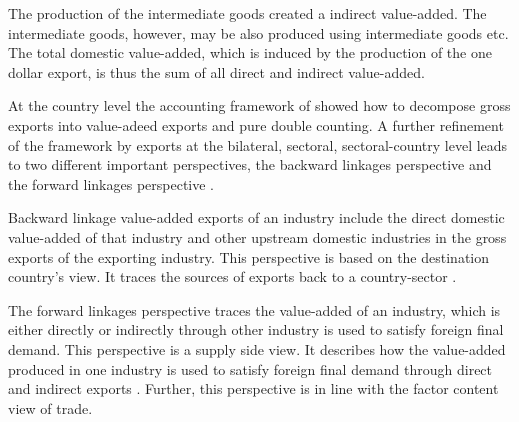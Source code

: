   The production of the intermediate goods created a indirect value-added.
  The intermediate goods, however, may be also produced using intermediate goods etc.
  The total domestic value-added, which is induced by the production of the one dollar export, is thus the sum of all direct and indirect value-added.
     \par
  At the country level the accounting framework of \textcite{Koopman} showed how to decompose gross exports into value-adeed exports and pure double counting.
   A further refinement of the framework by \textcite{wang2013} exports at the bilateral, sectoral, sectoral-country level leads to two different important perspectives,
   the backward linkages perspective and the forward linkages perspective \textcite{wang2013}. \par
Backward linkage value-added exports of an industry include the direct domestic value-added of that industry and other upstream domestic industries in the gross exports of the exporting industry.
 This perspective is based on the destination country's view.
  It traces the sources of exports back to a country-sector \textcite{wang2013}. \par
  The forward linkages perspective  traces the value-added of an industry, which is either directly or indirectly  through other industry is used to satisfy foreign final demand.
  This perspective is a supply side view.
  It describes how the value-added produced in one industry is used to satisfy foreign final demand through direct and indirect exports \textcite{wang2013}. Further, this perspective is in line with the factor content view of trade.
\par
